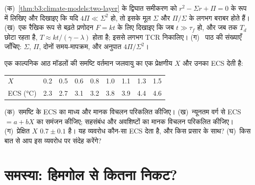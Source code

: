 \begin{exercise}[$\star\star\star$]\label{exo:b3:climate-models:11}
(क)~\cref{thm:b3:climate-models:two-layer} के द्विघात समीकरण को $r^2 -
\Sigma r + \Pi = 0$ के रूप में लिखिए और दिखाइए कि यदि $4\Pi \ll \Sigma^2$ हो, तो इसके मूल
$\Sigma$ और $\Pi/\Sigma$ के लगभग बराबर होते हैं। (ख)~एक रैखिक रूप से बढ़ते प्रणोदन $F = kt$ के लिए
दिखाइए कि जब $t \gg \tau_f$ हो, और जब तक $T_d$ छोटा रहता है,
$T \approx kt/(\gamma - \lambda)$ होता है; इससे लगभग TCR निकालिए। (ग)~
पाठ की संख्याएँ जाँचिए: $\Sigma$, $\Pi$, दोनों समय-मापक्रम, और
अनुपात $4\Pi/\Sigma^2$।
\end{exercise}

\begin{exercise}[$\star\star\star$]\label{exo:b3:climate-models:12}
एक काल्पनिक आठ मॉडलों की समष्टि वर्तमान जलवायु का एक प्रेक्षणीय $X$ और
उनका ECS देती है:
\begin{center}
\begin{tabular}{l*{8}{c}}
\hline
$X$ & 0.2 & 0.5 & 0.6 & 0.8 & 1.0 & 1.1 & 1.3 & 1.5\\
ECS (\unit{\celsius}) & 2.3 & 2.7 & 3.1 & 3.2 & 3.8 & 3.9 & 4.4 & 4.6\\
\hline
\end{tabular}
\end{center}
(क)~समष्टि के ECS का माध्य और मानक विचलन परिकलित कीजिए।
(ख)~न्यूनतम वर्ग से ECS $= a + bX$ का समंजन कीजिए; सहसंबंध
और अवशिष्टों का मानक विचलन परिकलित कीजिए। (ग)~प्रेक्षित $X$ $0.7
\pm 0.1$ है। यह व्यवरोध कौन-सा ECS देता है, और किस प्रसार के साथ?
(घ)~किस बात से आप इस व्यवरोध पर संदेह करेंगे?
\end{exercise}

\section{समस्या: हिमगोल से कितना निकट?}

